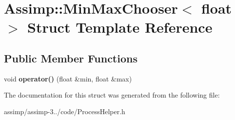 \hypertarget{struct_assimp_1_1_min_max_chooser_3_01float_01_4}{\section{Assimp\+:\+:Min\+Max\+Chooser$<$ float $>$ Struct Template Reference}
\label{struct_assimp_1_1_min_max_chooser_3_01float_01_4}
}
\subsection*{Public Member Functions}
\begin{DoxyCompactItemize}
\item 
\hypertarget{struct_assimp_1_1_min_max_chooser_3_01float_01_4_a3bc63ba54bd5f43713c587b5856a0dc2}{void {\bfseries operator()} (float \&min, float \&max)}\label{struct_assimp_1_1_min_max_chooser_3_01float_01_4_a3bc63ba54bd5f43713c587b5856a0dc2}

\end{DoxyCompactItemize}


The documentation for this struct was generated from the following file\+:\begin{DoxyCompactItemize}
\item 
assimp/assimp-\/3../code/Process\+Helper.\+h\end{DoxyCompactItemize}
